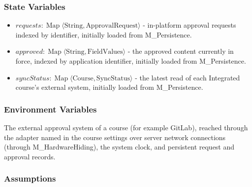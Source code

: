 \documentclass[12pt, titlepage]{article}
\begin{document}
\subsubsection{State Variables}

\begin{itemize}
    \item $\mathit{requests}:\operatorname{Map}\langle\text{String},\text{ApprovalRequest}\rangle$ - in-platform approval requests indexed by identifier, initially loaded from M\_Persistence.

    \item $\mathit{approved}:\operatorname{Map}\langle\text{String},\text{FieldValues}\rangle$ - the approved content currently in force, indexed by application identifier, initially loaded from M\_Persistence.

    \item $\mathit{syncStatus}:\operatorname{Map}\langle\text{Course},\text{SyncStatus}\rangle$ - the latest read of each Integrated course's external system, initially loaded from M\_Persistence.
\end{itemize}

\subsubsection{Environment Variables}

The external approval system of a course (for example GitLab), reached through the adapter named in the course settings over server network connections (through M\_HardwareHiding), the system clock, and persistent request and approval records.

\subsubsection{Assumptions}
\end{document}
